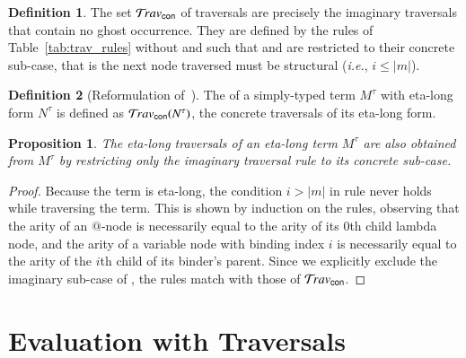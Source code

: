 \documentclass{elsarticle}
\makeatletter
\theoremstyle{plain}
\newtheorem{proposition}[theorem]{Proposition}
\theoremstyle{definition}
\newtheorem{definition}{Definition}[section]
\theoremstyle{remark}
\newcommand{\ghostvar}{\theta}
\newcommand{\concrete}{{\sf con}}
\renewcommand\ie{{\it i.e.\@\xspace}}
\makeatother
\begin{document}
\begin{definition}
    \label{def:concrete_traversals}
The set $\travset_\concrete$ of  traversals
are precisely the imaginary traversals that contain no ghost occurrence.
They are defined by the rules of Table~\ref{tab:trav_rules} without \rulenamet{Lam^\ghostvar} and such that  and  are restricted to their concrete sub-case, that is the next node traversed must be structural (\ie, $i\leq|m|$).

\end{definition}

\begin{definition}[Reformulation of~\cite{BlumPhd}]
The  of a simply-typed term $M^\tau$ with eta-long form $N^\tau$ is defined as $\travset_{\concrete}(N^\tau)$, the concrete traversals of its eta-long form.
\end{definition}

\begin{proposition}
\label{prop:ulc_and_stlc_trav_coincide}
The eta-long traversals of an eta-long term $M^\tau$ are also obtained from
$M^\tau$ by restricting only the imaginary traversal rule  to its concrete sub-case.
\end{proposition}
\begin{proof}
Because the term is eta-long, the condition $i>|m|$ in rule  never holds while traversing the term. This is shown by induction on the rules, observing that the arity of an $@$-node is necessarily equal to the arity of its $0$th child lambda node, and the arity of a variable node with binding index $i$ is necessarily equal to the arity of the $i$th child of its binder's parent.
Since we explicitly exclude the imaginary sub-case of , the rules match with those of $\travset_\concrete$.
\end{proof}


\section{Evaluation with Traversals}
\label{sec:normalizing_trav}
\end{document}
